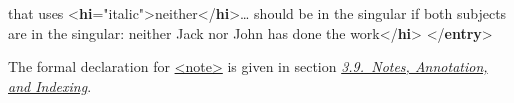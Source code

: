 \begin{shaded}
\hspace*{1em}\hspace*{1em} that uses {<\textbf{hi}\hspace*{1em}{rend}="{italic}">}neither{</\textbf{hi}>}… should be\mbox{}\newline 
\hspace*{1em}\hspace*{1em} in the singular if both subjects are in the singular:\mbox{}\newline 
{}neither Jack nor John has done the work{</\textbf{hi}>}\mbox{}\newline 
{}\mbox{}\newline 
{</\textbf{entry}>}\end{shaded}\egroup\par \par
The formal declaration for \hyperref[TEI.note]{<note>} is given in section \textit{\hyperref[CONO]{3.9.\ Notes, Annotation, and Indexing}}.
